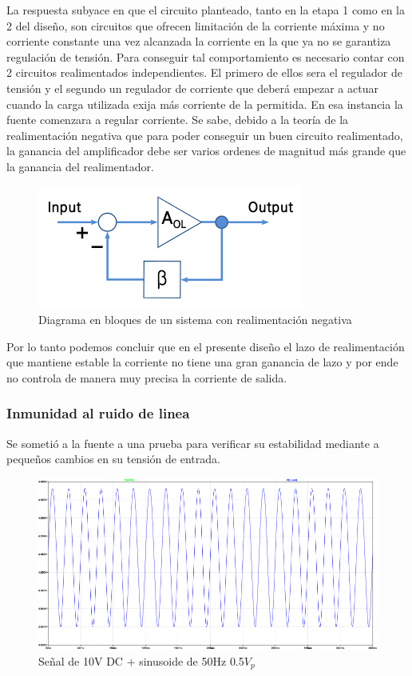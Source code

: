 La respuesta subyace en que el circuito planteado, tanto en la etapa 1 como en la 2 del diseño, son circuitos que ofrecen limitación de la corriente máxima y no corriente constante una vez alcanzada la corriente en la que ya no se garantiza regulación de tensión. Para conseguir tal comportamiento es necesario contar con 2 circuitos  realimentados independientes. El primero de ellos sera el regulador de tensión y el segundo un regulador de corriente que deberá empezar a actuar cuando la carga utilizada exija más corriente de la permitida. En esa instancia la fuente comenzara a regular corriente. Se sabe, debido a la teoría de la realimentación negativa que para poder conseguir un buen circuito realimentado, la ganancia del amplificador debe ser varios ordenes de magnitud más grande que la ganancia del realimentador. 

\begin{figure}[H]
	\centering
	\includegraphics[scale=0.5]{ImagenesEjercicio1/Feedback}
	\caption{Diagrama en bloques de un sistema con realimentación negativa}
	\label{fig:feedback}
\end{figure}
Por lo tanto podemos concluir que en el presente diseño el lazo de realimentación que mantiene estable la corriente no tiene una gran ganancia de lazo y por ende no controla de manera muy precisa la corriente de salida.

\subsubsection{Inmunidad al ruido de linea}
Se sometió a la fuente a una prueba para verificar su estabilidad mediante a pequeños cambios en su tensión de entrada. 

\begin{figure}[H]
	\centering
	\includegraphics[width=0.7\linewidth]{ImagenesEjercicio1/InmunidadRuidoDeLinea}
	\caption{Señal de 10V DC + sinusoide de 50Hz 0.5$V_{p}$}
	\label{fig:inmunidadruidodelinea}
\end{figure}


